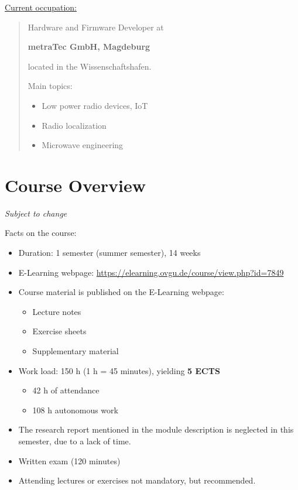 \vspace{2em}

\underline{Current occupation:}

\begin{quote}
	Hardware and Firmware Developer at
	
	\textbf{metraTec GmbH, Magdeburg}
	
	located in the Wissenschaftshafen.
	
	\vspace{1em}
	
	Main topics:
	\begin{itemize}
		\item Low power radio devices, IoT
		\item Radio localization
		\item Microwave engineering
	\end{itemize}
\end{quote}


\section{Course Overview}

\textit{Subject to change}

Facts on the course:
\begin{itemize}
	\item Duration: 1 semester (summer semester), 14 weeks
	\item E-Learning webpage: \url{https://elearning.ovgu.de/course/view.php?id=7849}
	\item Course material is published on the E-Learning webpage:
	\begin{itemize}
		\item Lecture notes
		\item Exercise sheets
		\item Supplementary material
	\end{itemize}
	\item Work load: 150 h (1 h = 45 minutes), yielding \textbf{5 ECTS}
	\begin{itemize}
		\item 42 h of attendance
		\item 108 h autonomous work
	\end{itemize}
	\item The research report mentioned in the module description is neglected in this semester, due to a lack of time.
	\item Written exam (120 minutes)
	\item Attending lectures or exercises not mandatory, but recommended.
\end{itemize}

